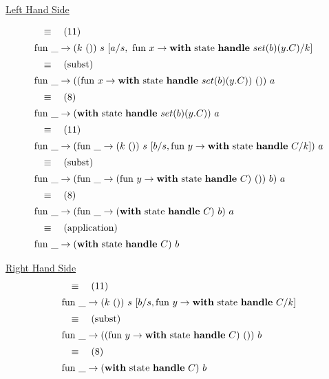 \documentclass[logo,bsc,singlespacing,parskip]{infthesis}
\begin{document}
\underline{Left Hand Side}

\[ 
\begin{array}{l}
\quad\equiv\quad (11) \\[5pt]
\text{fun }\_ \rightarrow (k\ ())\ s\ [a/s,\ \text{fun } x \rightarrow \text{\textbf{with} state \textbf{handle} } set(b)(y.C)/k] \\[5pt]
\quad\equiv\quad (\text{subst}) \\[5pt]
\text{fun }\_ \rightarrow ((\text{fun } x \rightarrow \text{\textbf{with} state \textbf{handle} } set(b)(y.C))\ ())\ a \\[5pt]
\quad\equiv\quad (8) \\[5pt]
\text{fun }\_ \rightarrow (\text{\textbf{with} state \textbf{handle} } set(b)(y.C))\ a \\[5pt]
\quad\equiv\quad (11) \\[5pt]
\text{fun }\_ \rightarrow (\text{fun }\_ \rightarrow (k\ ())\ s\ [b/s, \text{fun } y \rightarrow \text{\textbf{with} state \textbf{handle} } C/k])\ a \\[5pt]
\quad\equiv\quad (\text{subst}) \\[5pt]
\text{fun }\_ \rightarrow (\text{fun }\_ \rightarrow (\text{fun } y \rightarrow \text{\textbf{with} state \textbf{handle} } C)\ ())\ b)\ a \\[5pt]
\quad\equiv\quad (8) \\[5pt]
\text{fun }\_ \rightarrow (\text{fun }\_ \rightarrow (\text{\textbf{with} state \textbf{handle} } C)\ b)\ a \\[5pt]
\quad\equiv\quad (\text{application}) \\[5pt]
\text{fun }\_ \rightarrow (\text{\textbf{with} state \textbf{handle} } C)\ b
\end{array}
\]

\underline{Right Hand Side}
\[ 
\begin{array}{l}
\quad\equiv\quad (11) \\[5pt]
\text{fun }\_ \rightarrow (k\ ())\ s\ [b/s, \text{fun } y \rightarrow \text{\textbf{with} state \textbf{handle} } C/k] \\[5pt]
\quad\equiv\quad (\text{subst}) \\[5pt]
\text{fun }\_ \rightarrow ((\text{fun } y \rightarrow \text{\textbf{with} state \textbf{handle} } C)\ ())\ b \\[5pt]
\quad\equiv\quad (8) \\[5pt]
\text{fun }\_ \rightarrow (\text{\textbf{with} state \textbf{handle} } C)\ b
\end{array}
\]
\end{document}
